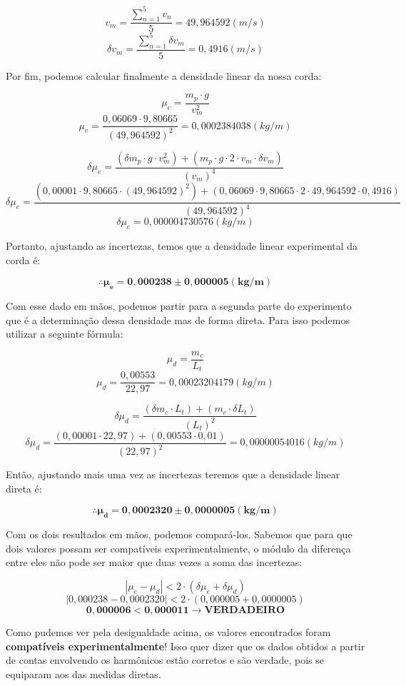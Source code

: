 \[ v_m = \frac{\sum_{n=1}^{5} v_n}{5} = 49,964592 (m/s)\]
\[ \delta v_m = \frac{\sum_{n=1}^{5} \delta v_m}{5} = 0,4916 (m/s) \]

Por fim, podemos calcular finalmente a densidade linear da nossa corda:

\[ \mu_e = \frac{m_p \cdot g}{v_m^2} \]
\[ \mu_e = \frac{0,06069 \cdot 9,80665}{(49,964592)^2} = 0,0002384038 (kg/m) \]

\[ \delta \mu_e = \frac{(\delta m_p \cdot g \cdot v_m^2) + (m_p \cdot g \cdot 2 \cdot v_m \cdot \delta v_m)}{(v_m)^4} \]
\[ \delta \mu_e = \frac{(0,00001 \cdot 9,80665 \cdot (49,964592)^2) + (0,06069 \cdot 9,80665 \cdot 2 \cdot 49,964592 \cdot 0,4916)}{(49,964592)^4} \]
\[ \delta \mu_e = 0,000004730576 (kg/m) \]

Portanto, ajustando as incertezas, temos que a densidade linear experimental da corda é:

\[ \mathbf{\therefore \mu_e = 0,000238 \pm 0,000005 (kg/m)} \]

Com esse dado em mãos, podemos partir para a segunda parte do experimento que é a determinação dessa densidade mas de forma direta. Para isso podemos utilizar a seguinte fórmula:

\[ \mu_d = \frac{m_c}{L_t} \]
\[ \mu_d = \frac{0,00553}{22,97} = 0,00023204179 (kg/m) \]

\[ \delta \mu_d = \frac{(\delta m_c \cdot L_t) + (m_c \cdot \delta L_t)}{(L_t)^2} \]
\[ \delta \mu_d = \frac{(0,00001 \cdot 22,97) + (0,00553 \cdot 0,01)}{(22,97)^2} = 0,00000054016 (kg/m) \]

Então, ajustando mais uma vez as incertezas teremos que a densidade linear direta é:

\[ \mathbf{\therefore \mu_d = 0,0002320 \pm 0,0000005 (kg/m)} \]

Com os dois resultados em mãos, podemos compará-los. Sabemos que para que dois valores possam ser compatíveis experimentalmente, o módulo da diferença entre eles não pode ser maior que duas vezes a soma das incertezas:

\[ |\mu_e - \mu_d| < 2 \cdot (\delta \mu_e + \delta \mu_d) \]
\[ |0,000238 - 0,0002320| < 2 \cdot (0,000005 + 0,0000005) \]
\[ \mathbf{0,000006 < 0,000011 \xrightarrow{} VERDADEIRO} \]

Como pudemos ver pela desigualdade acima, os valores encontrados foram \textbf{compatíveis experimentalmente}! Isso quer dizer que os dados obtidos a partir de contas envolvendo os harmônicos estão corretos e são verdade, pois se equiparam aos das medidas diretas.
